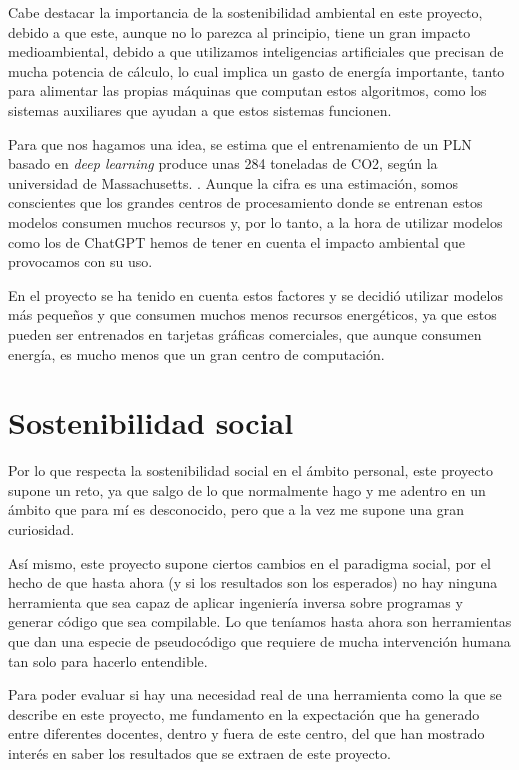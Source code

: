 
Cabe destacar la importancia de la sostenibilidad ambiental en este proyecto, debido a que este, aunque no lo parezca al principio, tiene un gran impacto medioambiental, debido
a que utilizamos inteligencias artificiales que precisan de mucha potencia de cálculo, lo cual implica un gasto de energía importante, tanto para alimentar las propias máquinas
que computan estos algoritmos, como los sistemas auxiliares que ayudan a que estos sistemas funcionen.

Para que nos hagamos una idea, se estima que el entrenamiento de un PLN basado en \textit{deep learning} produce unas 284 toneladas de CO2, según la universidad de Massachusetts.
\cite{Artículo_doctrinal}. Aunque la cifra es una estimación, somos conscientes que los grandes centros de procesamiento donde se entrenan estos modelos consumen muchos recursos y, por lo tanto, a
la hora de utilizar modelos como los de ChatGPT hemos de tener en cuenta el impacto ambiental que provocamos con su uso.

En el proyecto se ha tenido en cuenta estos factores y se decidió utilizar modelos más pequeños y que consumen muchos menos recursos energéticos, ya que estos pueden ser entrenados
en tarjetas gráficas comerciales, que aunque consumen energía, es mucho menos que un gran centro de computación.

\section{Sostenibilidad social}
\label{sec:sostenibilidad_social}


Por lo que respecta la sostenibilidad social en el ámbito personal, este proyecto supone un reto, ya que salgo de lo que normalmente hago y me adentro en un ámbito que
para mí es desconocido, pero que a la vez me supone una gran curiosidad.

Así mismo, este proyecto supone ciertos cambios en el paradigma social, por el hecho de que hasta ahora (y si los resultados son los esperados) no hay ninguna herramienta que sea
capaz de aplicar ingeniería inversa sobre programas y generar código que sea compilable. Lo que teníamos hasta ahora son herramientas que dan una especie de pseudocódigo que
requiere de mucha intervención humana tan solo para hacerlo entendible.

Para poder evaluar si hay una necesidad real de una herramienta como la que se describe en este proyecto, me fundamento en la expectación que ha generado entre diferentes docentes, dentro y
fuera de este centro, del que han mostrado interés en saber los resultados que se extraen de este proyecto.
